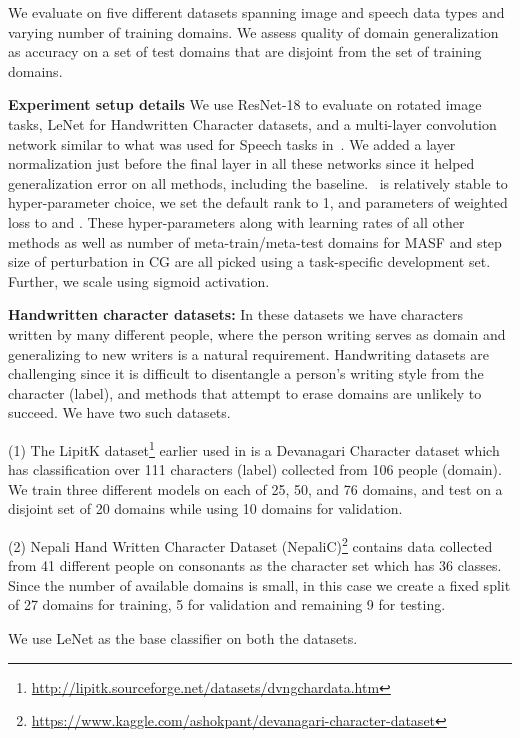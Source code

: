 \documentclass{article}
\begin{document}
We evaluate on five different datasets spanning image and speech data types and varying number of training domains. We assess quality of domain generalization as accuracy on a set of test domains that are disjoint from the set of training domains.

\textbf{Experiment setup details}
We use ResNet-18 to evaluate on rotated image tasks, LeNet for Handwritten Character datasets, and a multi-layer convolution network similar to what was used for Speech tasks in~\cite{VihariSSS18}. 
We added a layer normalization just before the final layer in all these networks since it helped generalization error on all methods, including the baseline. \mos\ is relatively stable to hyper-parameter choice, we set the default rank to 1, and parameters of weighted loss to  and . These hyper-parameters along with learning rates of all other methods as well as number of meta-train/meta-test domains for MASF and step size of perturbation in CG are all picked using a task-specific development set. Further, we scale  using sigmoid activation. 

\textbf{Handwritten character datasets:}
In these datasets we have characters  written by many different people, where the person writing serves as domain and generalizing to new writers is a natural requirement. Handwriting datasets are challenging since it is difficult to disentangle a person's writing style from the character (label), and methods that attempt to erase domains are unlikely to succeed.
We have two such datasets.

(1) The LipitK dataset\footnote{\url{http://lipitk.sourceforge.net/datasets/dvngchardata.htm}} earlier used in \cite{VihariSSS18} is a Devanagari Character dataset which has classification over 111 characters (label) collected from 106 people (domain).   We train three different models on each of 25, 50, and 76 domains, and test on a disjoint set of 20 domains while using 10 domains for validation.

(2) Nepali Hand Written Character Dataset (NepaliC)\footnote{\url{https://www.kaggle.com/ashokpant/devanagari-character-dataset}} contains data collected from 41 different people on consonants as the character set which has 36 classes. Since the number of available domains is small, in this case we create a fixed split of 27 domains for training, 5 for validation and remaining 9 for testing. 

We use LeNet as the base classifier on both the datasets. 
\end{document}
